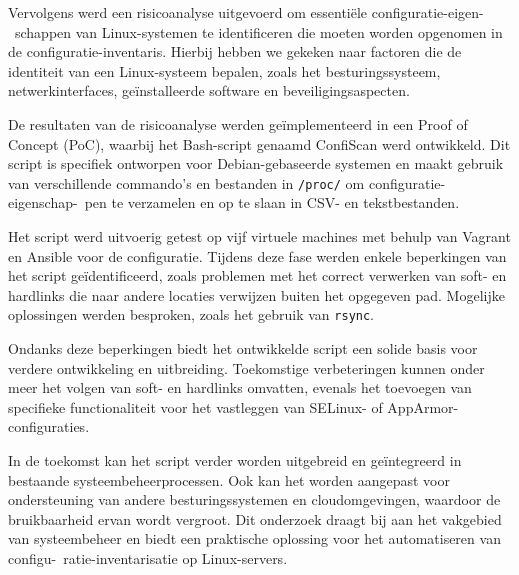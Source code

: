 Vervolgens werd een risicoanalyse uitgevoerd om essenti\"ele configuratie-eigen-\ schappen van Linux-systemen te identificeren die moeten worden opgenomen in de configuratie-inventaris.
Hierbij hebben we gekeken naar factoren die de identiteit van een Linux-systeem bepalen, zoals het besturingssysteem, netwerkinterfaces, ge\"installeerde software en beveiligingsaspecten.

De resultaten van de risicoanalyse werden ge\"implementeerd in een Proof of Concept (PoC), waarbij het Bash-script genaamd ConfiScan werd ontwikkeld.
Dit script is specifiek ontworpen voor Debian-gebaseerde systemen en maakt gebruik van verschillende commando's en bestanden in \texttt{/proc/} om configuratie-eigenschap-\ pen te verzamelen en op te slaan in CSV- en tekstbestanden.

Het script werd uitvoerig getest op vijf virtuele machines met behulp van Vagrant en Ansible voor de configuratie.
Tijdens deze fase werden enkele beperkingen van het script ge\"identificeerd, zoals problemen met het correct verwerken van soft- en hardlinks die naar andere locaties verwijzen buiten het opgegeven pad.
Mogelijke oplossingen werden besproken, zoals het gebruik van \texttt{rsync}.

Ondanks deze beperkingen biedt het ontwikkelde script een solide basis voor verdere ontwikkeling en uitbreiding.
Toekomstige verbeteringen kunnen onder meer het volgen van soft- en hardlinks omvatten, evenals het toevoegen van specifieke functionaliteit voor het vastleggen van SELinux- of AppArmor-configuraties.

In de toekomst kan het script verder worden uitgebreid en ge\"integreerd in bestaande systeembeheerprocessen.
Ook kan het worden aangepast voor ondersteuning van andere besturingssystemen en cloudomgevingen, waardoor de bruikbaarheid ervan wordt vergroot.
Dit onderzoek draagt bij aan het vakgebied van systeembeheer en biedt een praktische oplossing voor het automatiseren van configu-\ ratie-inventarisatie op Linux-servers.
